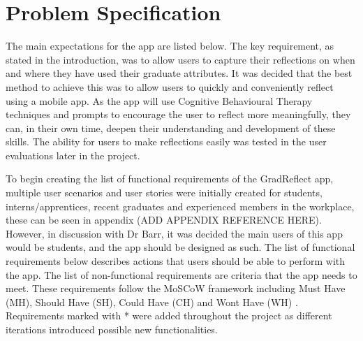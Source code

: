 \documentclass{l4proj}
\begin{document}
\section{Problem Specification}

The main expectations for the app are listed below. The key requirement, as stated in the introduction, was to allow users to capture their reflections on when and where they have used their graduate attributes. It was decided that the best method to achieve this was to allow users to quickly and conveniently reflect using a mobile app. As the app will use Cognitive Behavioural Therapy techniques and prompts to encourage the user to reflect more meaningfully, they can, in their own time, deepen their understanding and development of these skills. The ability for users to make reflections easily was tested in the user evaluations later in the project. 

To begin creating the list of functional requirements of the GradReflect app, multiple user scenarios and user stories were initially created for students, interns/apprentices, recent graduates and experienced members in the workplace, these can be seen in appendix (ADD APPENDIX REFERENCE HERE). However, in discussion with Dr Barr, it was decided the main users of this app would be students, and the app should be designed as such. The list of functional requirements below describes actions that users should be able to perform with the app. The list of non-functional requirements are criteria that the app needs to meet. These requirements follow the MoSCoW framework including Must Have (MH), Should Have (SH), Could Have (CH) and Wont Have (WH) \citep{consortium_chapter_2014}. Requirements marked with * were added throughout the project as different iterations introduced possible new functionalities. 
\end{document}
